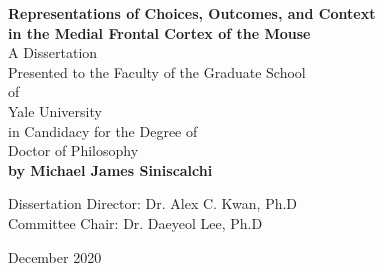 
\begin{titlepage}
\centering
\singlespace

\vspace*{1in}

\textbf{
Representations of Choices, Outcomes, and Context\\ 
in the Medial Frontal Cortex of the Mouse}\\
 
\vfill
A Dissertation\\Presented to the Faculty of the Graduate School\\of\\Yale University\\
in Candidacy for the Degree of\\Doctor of Philosophy\\

\vfill
\textbf{by Michael James Siniscalchi}

\vspace{0.5in}
Dissertation Director: Dr. Alex C. Kwan, Ph.D\\
Committee Chair: Dr. Daeyeol Lee, Ph.D

\vspace{0.5in}
December 2020
 
\vspace{1in}
\end{titlepage}